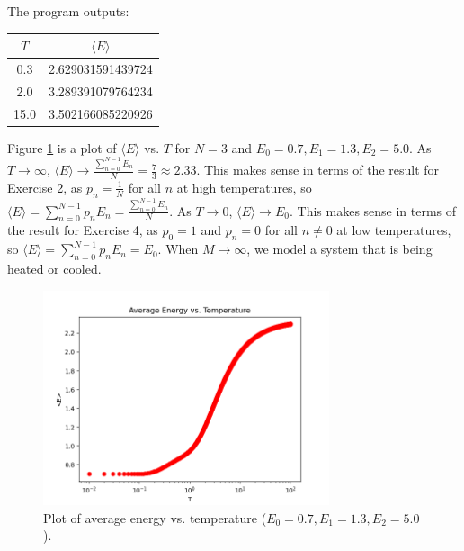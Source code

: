 \documentclass{article}
\begin{document}
\clearpage

\problem
The program outputs:
\begin{center}
    \begin{tabular}{|c|c|}
        \hline
        $T$ & $\langle E \rangle$ \\
        \hline
        0.3 & 2.629031591439724 \\
        \hline
        2.0 & 3.289391079764234 \\
        \hline
        15.0 & 3.502166085220926 \\
        \hline
    \end{tabular}
\end{center}

\clearpage

\problem
Figure \ref{fig:fig1} is a plot of $\langle E \rangle$ vs. $T$  for $N = 3$ and $E_0 = 0.7, E_1 = 1.3, E_2 = 5.0$. As $T \to \infty$, $\langle E \rangle \to \frac{\sum_{n=0}^{N-1}E_n}{N} = \frac{7}{3} \approx 2.33$. This makes sense in terms of the result for Exercise 2, as $p_n = \frac{1}{N}$ for all $n$ at high temperatures, so $\langle E \rangle = \sum_{n=0}^{N-1}p_n E_n = \frac{\sum_{n=0}^{N-1}E_n}{N}$. As $T \to 0$, $\langle E \rangle \to E_0$. This makes sense in terms of the result for Exercise 4, as $p_0 = 1$ and $p_n = 0$ for all $n \neq 0$ at low temperatures, so $\langle E \rangle = \sum_{n=0}^{N-1}p_n E_n = E_0$. When $M \to \infty$, we model a system that is being heated or cooled.

\begin{figure}[!htb]
    \begin{centering}
    \includegraphics[width=0.75\textwidth]{../code/phy112l_lab1/1-8.png}
    \caption{Plot of average energy vs. temperature  ($E_0 = 0.7, E_1 = 1.3, E_2 = 5.0$).}
    \label{fig:fig1}
    \end{centering}
\end{figure}
\end{document}
